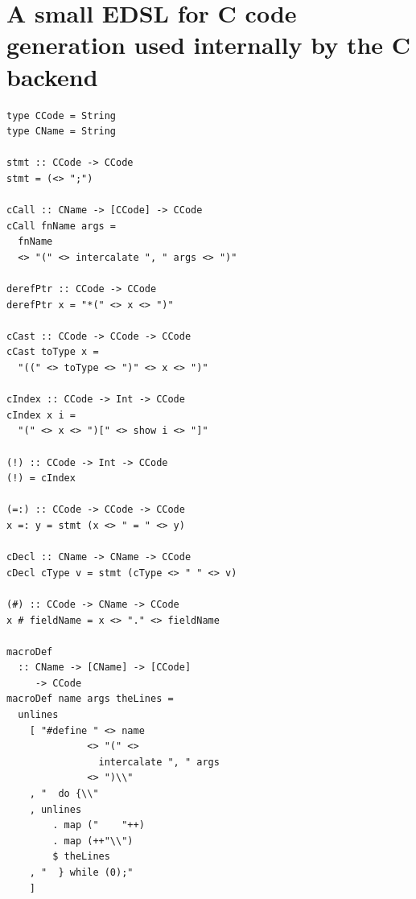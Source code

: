 \documentclass[runningheads, a4paper]{llncs}
\newcommand{\showtodos}{}  %
\newenvironment{todo}
  {\ifthenelse{\isundefined{\showtodos}}{\comment}{\begin{tcolorbox}
    \textbf{TODO}:}}
  {\ifthenelse{\isundefined{\showtodos}}{\endcomment}{\end{tcolorbox}}
  }
\providecommand\BibTeX{{%
    \normalfont B\kern-0.5em{\scshape i\kern-0.25em b}\kern-0.8em\TeX}}}
\begin{document}
\section{A small EDSL for C code generation used internally by the C backend}
\begin{lstlisting}[basicstyle=\tiny]
type CCode = String
type CName = String

stmt :: CCode -> CCode
stmt = (<> ";")

cCall :: CName -> [CCode] -> CCode
cCall fnName args =
  fnName
  <> "(" <> intercalate ", " args <> ")"

derefPtr :: CCode -> CCode
derefPtr x = "*(" <> x <> ")"

cCast :: CCode -> CCode -> CCode
cCast toType x =
  "((" <> toType <> ")" <> x <> ")"

cIndex :: CCode -> Int -> CCode
cIndex x i =
  "(" <> x <> ")[" <> show i <> "]"

(!) :: CCode -> Int -> CCode
(!) = cIndex

(=:) :: CCode -> CCode -> CCode
x =: y = stmt (x <> " = " <> y)

cDecl :: CName -> CName -> CCode
cDecl cType v = stmt (cType <> " " <> v)

(#) :: CCode -> CName -> CCode
x # fieldName = x <> "." <> fieldName

macroDef
  :: CName -> [CName] -> [CCode]
     -> CCode
macroDef name args theLines =
  unlines
    [ "#define " <> name
              <> "(" <>
                intercalate ", " args
              <> ")\\"
    , "  do {\\"
    , unlines
        . map ("    "++)
        . map (++"\\")
        $ theLines
    , "  } while (0);"
    ]
\end{lstlisting}






%   
%   
\end{document}
